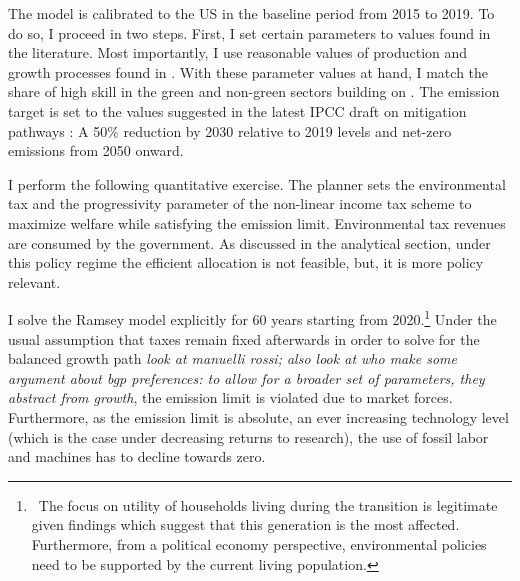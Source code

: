 The model is calibrated to the US in the baseline period from 2015 to 2019. To do so, I proceed in two steps. First, I set certain parameters to values found in the literature. Most importantly, I use reasonable values of production and growth processes found in \cite{Fried2018ClimateAnalysis}. %
With these parameter values at hand, I match the share of high skill in the green and non-green sectors building on \cite{Consoli2016DoCapital}. The emission target is set to the values suggested in the latest IPCC draft on mitigation pathways \citep{IPCC2022}: A 50\% reduction by 2030 relative to 2019 levels and  net-zero emissions from 2050 onward.

I perform the following quantitative exercise. 
 The planner sets the environmental tax and the progressivity parameter of the non-linear income tax scheme to maximize welfare while satisfying the emission limit. Environmental tax revenues are consumed by the government. As discussed in the analytical section, under this policy regime the efficient allocation is not feasible, but, it is  more policy relevant. 

I solve the Ramsey model explicitly for 60 years starting from 2020.\footnote{\ The focus on utility of households living during the transition is legitimate given findings which suggest that this generation is the most affected. Furthermore, from a political economy perspective, environmental policies need to be supported by the current living population. }
Under the usual assumption that taxes remain fixed afterwards in order to solve for the balanced growth path \textit{look at manuelli rossi; also look at \cite{Conesa2009TaxingAll} who make some argument about bgp preferences: to allow for a broader set of parameters, they abstract from growth}, the emission limit is violated due to market forces.
Furthermore, as the emission limit is absolute, an ever increasing technology level (which is the case under decreasing returns to research), the use of fossil labor and machines has to decline towards zero.

